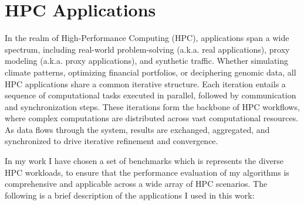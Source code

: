 \section{HPC Applications}
\label{sec:exp}
In the realm of High-Performance Computing (HPC), applications span a wide spectrum, including real-world problem-solving (a.k.a. real applications), proxy modeling (a.k.a. proxy applications), and synthetic traffic. Whether simulating climate patterns, optimizing financial portfolios, or deciphering genomic data, all HPC applications share a common iterative structure. Each iteration entails a sequence of computational tasks executed in parallel, followed by communication and synchronization steps. These iterations form the backbone of HPC workflows, where complex computations are distributed across vast computational resources. As data flows through the system, results are exchanged, aggregated, and synchronized to drive iterative refinement and convergence.

In my work I have chosen a set of benchmarks which is represents the diverse HPC workloads, to ensure that the performance evaluation of my algorithms is comprehensive and applicable across a wide array of HPC scenarios.
The following is a brief description of the applications I used in this work:

